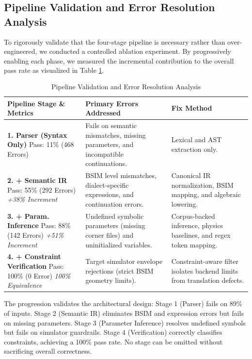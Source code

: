 \documentclass[conference]{IEEEtran}
\begin{document}
\subsection{Pipeline Validation and Error Resolution Analysis}
\label{sec:results-ablation}
To rigorously validate that the four-stage pipeline is necessary rather than over-engineered, we conducted a controlled ablation experiment. By progressively enabling each phase, we measured the incremental contribution to the overall pass rate as visualized in Table \ref{tab:ablation}.
\begin{table}[!t]
\caption{Pipeline Validation and Error Resolution Analysis}
\label{tab:ablation}
\centering
\renewcommand{\arraystretch}{1.3} %
\footnotesize %
\begin{tabular}{@{}p{2.6cm}p{3.0cm}p{2.6cm}@{}}
\toprule
\textbf{Pipeline Stage \& Metrics} & \textbf{Primary Errors Addressed} & \textbf{Fix Method} \\
\midrule
\textbf{1. Parser (Syntax Only)} \newline 
Pass: 11\% (468 Errors) \newline 
& Fails on semantic mismatches, missing parameters, and incompatible continuations. 
& Lexical and AST extraction only. \\
\midrule
\textbf{2. + Semantic IR} \newline 
Pass: 55\% (292 Errors) \newline 
\textit{+38\% Increment} 
& BSIM level mismatches, dialect-specific expressions, and continuation errors. 
& Canonical IR normalization, BSIM mapping, and algebraic lowering. \\
\midrule
\textbf{3. + Param. Inference} \newline 
Pass: 88\% (142 Errors) \newline 
\textit{+51\% Increment} 
& Undefined symbolic parameters (missing corner files) and uninitialized variables. 
& Corpus-backed inference, physics baselines, and regex token mapping. \\
\midrule
\textbf{4. + Constraint Verification} \newline 
Pass: 100\% (0 Error) \newline 
\textit{100\% Equivalence} 
& Target simulator envelope rejections (strict BSIM geometry limits). 
& Constraint-aware filter isolates backend limits from translation defects. \\
\bottomrule
\end{tabular}
\end{table}
The progression validates the architectural design: Stage 1 (Parser) fails on 89\% of inputs. Stage 2 (Semantic IR) eliminates BSIM and expression errors but fails on missing parameters. Stage 3 (Parameter Inference) resolves undefined symbols but fails on simulator guardrails. Stage 4 (Verification) correctly classifies constraints, achieving a 100\% pass rate. No stage can be omitted without sacrificing overall correctness.
\end{document}
